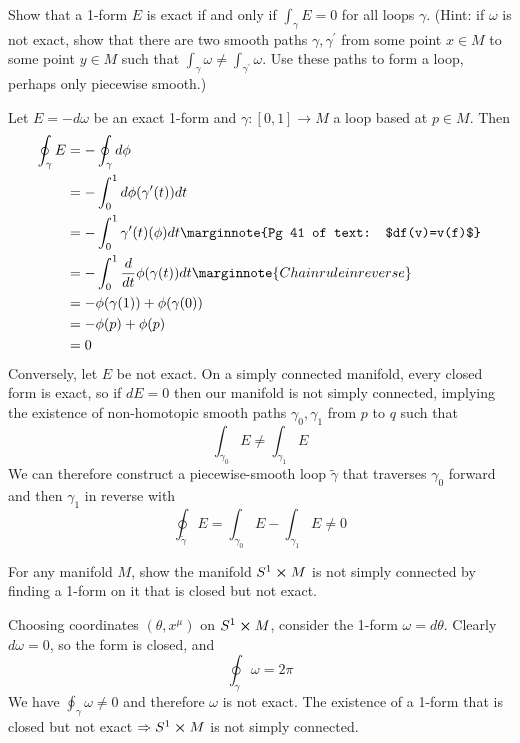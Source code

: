 \documentclass[10pt]{article}
\begin{document}
\begin{example}
	Show that a 1-form $E$ is exact if and only if $\int_\gamma E = 0$ for all loops $\gamma$. (Hint: if $\omega$ is not exact, show that there are two smooth paths $\gamma,\gamma^\prime$ from some point $x \in M$ to some point $y \in M$ such that $\int_\gamma \omega\ne\int_{\gamma^\prime} \omega$. Use these paths to form a loop, perhaps only piecewise smooth.)
\end{example}
\sol Let $E=-d\omega$ be an exact 1-form and $\gamma:[0,1]\to M$ a loop based at $p \in M$. Then
$$
\begin{aligned}
	\oint_\gamma E &= -\oint_\gamma d\phi\\
	&= -\int_{0}^{1} d\phi(\gamma^\prime(t)) dt\\
	&= -\int_{0}^{1} \gamma^\prime(t)(\phi) dt\marginnote{Pg 41 of text: $df(v)=v(f)$}\\
	&= -\int_{0}^{1} \frac{d}{dt}\phi(\gamma(t))dt\marginnote{Chain rule in reverse}\\
	&= -\phi(\gamma(1))+\phi(\gamma(0))\\
	&= -\phi(p)+\phi(p)\\
	&= 0
\end{aligned}
$$
Conversely, let $E$ be not exact. On a simply connected manifold, every closed form is exact, so if $dE=0$ then our manifold is not simply connected, implying the existence of non-homotopic smooth paths $\gamma_0, \gamma_1$ from $p$ to $q$ such that
$$
\int_{\gamma_0} E \ne \int_{\gamma_1} E
$$
We can therefore construct a piecewise-smooth loop $\tilde{\gamma}$ that traverses $\gamma_0$ forward and then $\gamma_1$ in reverse with
$$
\oint_{\tilde{\gamma}} E = \int_{\gamma_0} E - \int_{\gamma_1} E \ne 0
$$


\begin{example}\label{b1e83}
	For any manifold $M$, show the manifold $S^1 \cross M$ is not simply connected by finding a 1-form on it that is closed but not exact.
\end{example}
\sol Choosing coordinates $(\theta, x^\mu)$ on $S^1\cross M$, consider the 1-form $\omega=d\theta$. Clearly $d\omega=0$, so the form is closed, and
$$
\oint_\gamma \omega = 2\pi
$$
We have $\oint_\gamma \omega \ne 0$ and therefore $\omega$ is not exact. 
The existence of a 1-form that is closed but not exact $\Rightarrow S^1 \cross M$ is not simply connected.
\end{document}
